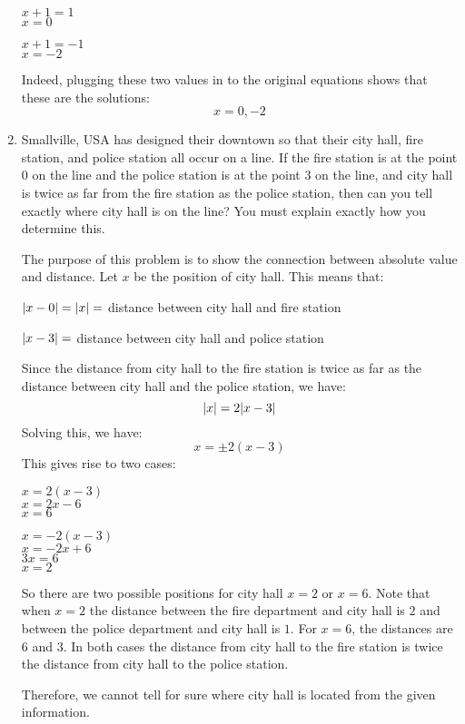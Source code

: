 \documentclass[letterpaper,12pt,fleqn]{article}
\begin{document}
\begin{enumerate}
  \bigskip

  \begin{minipage}{2in}
    $x+1=1$ \\
    $x=0$
  \end{minipage}
  \begin{minipage}{2in}
    $x+1=-1$ \\
    $x=-2$
  \end{minipage}

  \bigskip

  Indeed, plugging these two values in to the original equations shows that
  these are the solutions:
  \[x=0,-2\]

\item Smallville, USA has designed their downtown so that their city hall,
  fire station, and police station all occur on a line. If the fire station
  is at the point 0 on the line and the police station is at the point 3 on
  the line, and city hall is twice as far from the fire station as the police
  station, then can you tell exactly where city hall is on the line? You must
  explain exactly how you determine this.

  The purpose of this problem is to show the connection between absolute value
  and distance. Let $x$ be the position of city hall. This means that:

  $\lvert x-0\rvert=\lvert x\rvert=$ distance between city hall and fire station

  $\lvert x-3\rvert=$ distance between city hall and police station

  Since the distance from city hall to the fire station is twice as far as the
  distance between city hall and the police station, we have:
  \[\lvert x\rvert=2\lvert x-3\rvert\]
  Solving this, we have:
  \[x=\pm2(x-3)\]
  This gives rise to two cases:

  \bigskip

  \begin{minipage}{2in}
    $x=2(x-3)$ \\
    $x=2x-6$ \\
    $x=6$
  \end{minipage}
  \begin{minipage}{2in}
    $x=-2(x-3)$ \\
    $x=-2x+6$ \\
    $3x=6$ \\
    $x=2$
  \end{minipage}

  \bigskip

  So there are two possible positions for city hall $x=2$ or $x=6$. Note that
  when $x=2$ the distance between the fire department and city hall is $2$
  and between the police department and city hall is $1$. For $x=6$, the
  distances are $6$ and $3$. In both cases the distance from city hall to the
  fire station is twice the distance from city hall to the police station.

  Therefore, we cannot tell for sure where city hall is located from the given
  information.
\end{enumerate}
\end{document}
